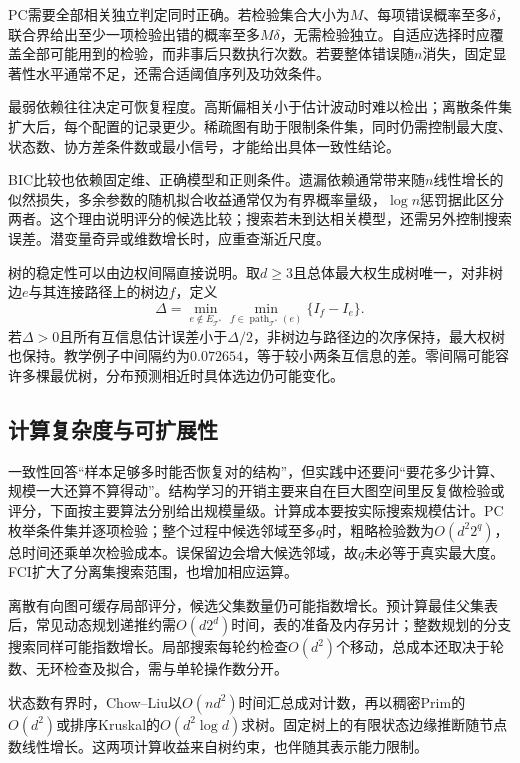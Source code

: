 PC需要全部相关独立判定同时正确。若检验集合大小为$M$、每项错误概率至多$\delta$，联合界给出至少一项检验出错的概率至多$M\delta$，无需检验独立。自适应选择时应覆盖全部可能用到的检验，而非事后只数执行次数。若要整体错误随$n$消失，固定显著性水平通常不足，还需合适阈值序列及功效条件。

最弱依赖往往决定可恢复程度。高斯偏相关小于估计波动时难以检出；离散条件集扩大后，每个配置的记录更少。稀疏图有助于限制条件集，同时仍需控制最大度、状态数、协方差条件数或最小信号，才能给出具体一致性结论。

BIC比较也依赖固定维、正确模型和正则条件。遗漏依赖通常带来随$n$线性增长的似然损失，多余参数的随机拟合收益通常仅为有界概率量级，$\log n$惩罚据此区分两者。这个理由说明评分的候选比较；搜索若未到达相关模型，还需另外控制搜索误差。潜变量奇异或维数增长时，应重查渐近尺度。

树的稳定性可以由边权间隔直接说明。取$d\geq3$且总体最大权生成树唯一，对非树边$e$与其连接路径上的树边$f$，定义
\[
  \Delta=\min_{e\notin E_{\mathcal{T}^{*}}}
             \min_{f\in\operatorname{path}_{\mathcal{T}^{*}}(e)}
             \{I_f-I_e\}.
\]
若$\Delta>0$且所有互信息估计误差小于$\Delta/2$，非树边与路径边的次序保持，最大权树也保持。教学例子中间隔约为$0.072654$，等于较小两条互信息的差。零间隔可能容许多棵最优树，分布预测相近时具体选边仍可能变化。

\subsection{计算复杂度与可扩展性}
\label{sec:pgm-structure-learning-complexity}

一致性回答“样本足够多时能否恢复对的结构”，但实践中还要问“要花多少计算、规模一大还算不算得动”。结构学习的开销主要来自在巨大图空间里反复做检验或评分，下面按主要算法分别给出规模量级。计算成本要按实际搜索规模估计。PC枚举条件集并逐项检验；整个过程中候选邻域至多$q$时，粗略检验数为$O(d^2 2^q)$，总时间还乘单次检验成本。误保留边会增大候选邻域，故$q$未必等于真实最大度。FCI扩大了分离集搜索范围，也增加相应运算。

离散有向图可缓存局部评分，候选父集数量仍可能指数增长。预计算最佳父集表后，常见动态规划递推约需$O(d2^d)$时间，表的准备及内存另计；整数规划的分支搜索同样可能指数增长。局部搜索每轮约检查$O(d^2)$个移动，总成本还取决于轮数、无环检查及拟合，需与单轮操作数分开。

状态数有界时，Chow--Liu以$O(nd^2)$时间汇总成对计数，再以稠密Prim的$O(d^2)$或排序Kruskal的$O(d^2\log d)$求树。固定树上的有限状态边缘推断随节点数线性增长。这两项计算收益来自树约束，也伴随其表示能力限制。

